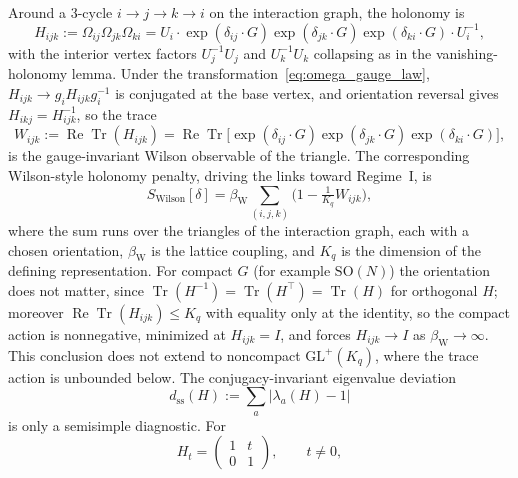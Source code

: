 Around a 3-cycle $i\to j\to k\to i$ on the interaction graph, the holonomy is
\begin{equation}
H_{ijk}
:= \Omega_{ij}\Omega_{jk}\Omega_{ki}
= U_i \cdot \exp(\delta_{ij}\cdot G) \exp(\delta_{jk}\cdot G) \exp(\delta_{ki}\cdot G) \cdot U_i^{-1},
\label{eq:discrete_holonomy}
\end{equation}
with the interior vertex factors $U_j^{-1}U_j$ and $U_k^{-1}U_k$ collapsing as in the vanishing-holonomy lemma. Under the transformation~\eqref{eq:omega_gauge_law}, $H_{ijk} \to g_i H_{ijk} g_i^{-1}$ is conjugated at the base vertex, and orientation reversal gives $H_{ikj} = H_{ijk}^{-1}$, so the trace
\begin{equation}
W_{ijk} := \operatorname{Re}\operatorname{Tr}(H_{ijk})
= \operatorname{Re}\operatorname{Tr}\big[\exp(\delta_{ij}\cdot G) \exp(\delta_{jk}\cdot G) \exp(\delta_{ki}\cdot G)\big],
\label{eq:wilson_observable}
\end{equation}
is the gauge-invariant Wilson observable of the triangle. The corresponding Wilson-style holonomy penalty, driving the links toward Regime~I, is
\begin{equation}
S_{\mathrm{Wilson}}[\delta]
= \beta_{\mathrm{W}} \sum_{(i,j,k)} \Big(1 - \tfrac{1}{K_q} W_{ijk}\Big),
\label{eq:wilson_action}
\end{equation}
where the sum runs over the triangles of the interaction graph, each with a chosen orientation, $\beta_{\mathrm{W}}$ is the lattice coupling, and $K_q$ is the dimension of the defining representation. For compact $G$ (for example $\mathrm{SO}(N)$) the orientation does not matter, since $\operatorname{Tr}(H^{-1}) = \operatorname{Tr}(H^\top) = \operatorname{Tr}(H)$ for orthogonal $H$; moreover $\operatorname{Re}\operatorname{Tr}(H_{ijk})\le K_q$ with equality only at the identity, so the compact action is nonnegative, minimized at $H_{ijk}=I$, and forces $H_{ijk} \to I$ as $\beta_{\mathrm{W}} \to \infty$. This conclusion does not extend to noncompact $\mathrm{GL}^+(K_q)$, where the trace action is unbounded below. The conjugacy-invariant eigenvalue deviation
\begin{equation}
d_{\mathrm{ss}}(H):=\sum_a|\lambda_a(H)-1|
\end{equation}
is only a semisimple diagnostic. For
\begin{equation}
H_t=\begin{pmatrix}1&t\\0&1\end{pmatrix},\qquad t\ne0,
\end{equation}
